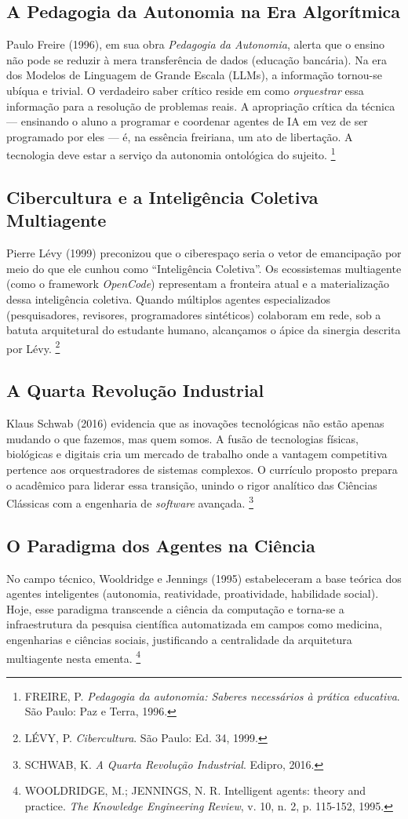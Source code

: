 \documentclass[12pt,a4paper]{article}
\begin{document}
\subsection{A Pedagogia da Autonomia na Era Algorítmica}
Paulo Freire (1996), em sua obra \textit{Pedagogia da Autonomia}, alerta que o ensino não pode se reduzir à mera transferência de dados (educação bancária). Na era dos Modelos de Linguagem de Grande Escala (LLMs), a informação tornou-se ubíqua e trivial. O verdadeiro saber crítico reside em como \textit{orquestrar} essa informação para a resolução de problemas reais. A apropriação crítica da técnica --- ensinando o aluno a programar e coordenar agentes de IA em vez de ser programado por eles --- é, na essência freiriana, um ato de libertação. A tecnologia deve estar a serviço da autonomia ontológica do sujeito.
\footnote{FREIRE, P. \textit{Pedagogia da autonomia: Saberes necessários à prática educativa}. São Paulo: Paz e Terra, 1996.}

\subsection{Cibercultura e a Inteligência Coletiva Multiagente}
Pierre Lévy (1999) preconizou que o ciberespaço seria o vetor de emancipação por meio do que ele cunhou como ``Inteligência Coletiva''. Os ecossistemas multiagente (como o framework \textit{OpenCode}) representam a fronteira atual e a materialização dessa inteligência coletiva. Quando múltiplos agentes especializados (pesquisadores, revisores, programadores sintéticos) colaboram em rede, sob a batuta arquitetural do estudante humano, alcançamos o ápice da sinergia descrita por Lévy.
\footnote{LÉVY, P. \textit{Cibercultura}. São Paulo: Ed. 34, 1999.}

\subsection{A Quarta Revolução Industrial}
Klaus Schwab (2016) evidencia que as inovações tecnológicas não estão apenas mudando o que fazemos, mas quem somos. A fusão de tecnologias físicas, biológicas e digitais cria um mercado de trabalho onde a vantagem competitiva pertence aos orquestradores de sistemas complexos. O currículo proposto prepara o acadêmico para liderar essa transição, unindo o rigor analítico das Ciências Clássicas com a engenharia de \textit{software} avançada.
\footnote{SCHWAB, K. \textit{A Quarta Revolução Industrial}. Edipro, 2016.}

\subsection{O Paradigma dos Agentes na Ciência}
No campo técnico, Wooldridge e Jennings (1995) estabeleceram a base teórica dos agentes inteligentes (autonomia, reatividade, proatividade, habilidade social). Hoje, esse paradigma transcende a ciência da computação e torna-se a infraestrutura da pesquisa científica automatizada em campos como medicina, engenharias e ciências sociais, justificando a centralidade da arquitetura multiagente nesta ementa.
\footnote{WOOLDRIDGE, M.; JENNINGS, N. R. Intelligent agents: theory and practice. \textit{The Knowledge Engineering Review}, v. 10, n. 2, p. 115-152, 1995.}
\end{document}
